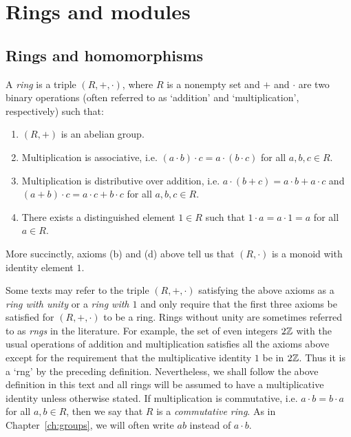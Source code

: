 \chapter{Rings and modules}
\label{ch:rings}

\section{Rings and homomorphisms}

\begin{definition}
    A \emph{ring} is a triple \((R, +, \cdot)\), where \(R\) is a nonempty set
    and \(+\) and \(\cdot\) are two binary operations (often referred to as
    `addition' and `multiplication', respectively) such that:
    \begin{enumerate}[label=(\alph*)]
        \item \((R, +)\) is an abelian group.
        \item Multiplication is associative, i.e. \((a \cdot b) \cdot c = a
        \cdot (b \cdot c)\) for all \(a, b, c \in R\).
        \item Multiplication is distributive over addition, i.e. \(a \cdot (b +
        c) = a \cdot b + a \cdot c\) and \((a + b) \cdot c = a \cdot c + b \cdot
        c\) for all \(a, b, c \in R\).
        \item There exists a distinguished element \(1 \in R\) such that \(1
        \cdot a = a \cdot 1 = a\) for all \(a \in R\).
    \end{enumerate}
\end{definition}

More succinctly, axioms (b) and (d) above tell us that \((R, \cdot)\) is a
monoid with identity element \(1\).

Some texts may refer to the triple \((R, +, \cdot)\) satisfying the above axioms
as a \emph{ring with unity} or a \emph{ring with \(1\)} and only require that
the first three axioms be satisfied for \((R, +, \cdot)\) to be a ring. Rings
without unity are sometimes referred to as \emph{rngs} in the literature. For
example, the set of even integers \(2\mathbb{Z}\) with the usual operations of addition
and multiplication satisfies all the axioms above except for the requirement
that the multiplicative identity \(1\) be in \(2\mathbb{Z}\). Thus it is a `rng' by the
preceding definition. Nevertheless, we shall follow the above definition in this
text and all rings will be assumed to have a multiplicative identity unless
otherwise stated. If multiplication is commutative, i.e. \(a \cdot b = b \cdot
a\) for all \(a, b \in R\), then we say that \(R\) is a \emph{commutative ring}.
As in Chapter~\ref{ch:groups}, we will often write \(ab\) instead of \(a \cdot
b\).

